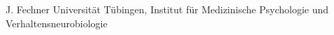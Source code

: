 
                {J. Fechner}
                {Universität Tübingen, Institut für Medizinische Psychologie und Verhaltensneurobiologie}
                